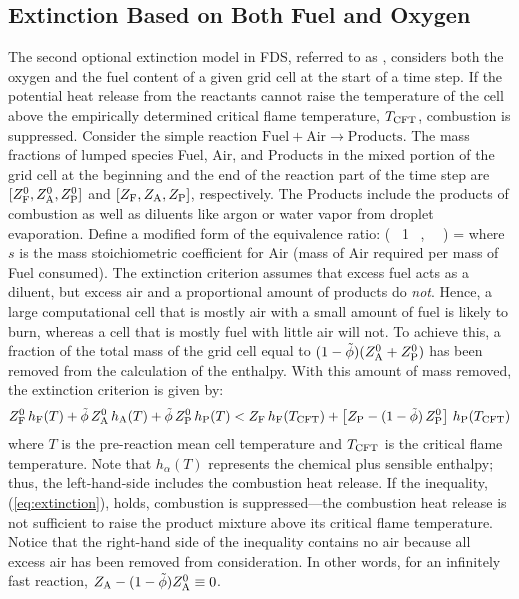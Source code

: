 \subsection{Extinction Based on Both Fuel and Oxygen}

The second optional extinction model in FDS, referred to as , considers both the oxygen and the fuel content of a given grid cell at the start of a time step. If the potential heat release from the reactants cannot raise the temperature of the cell above the empirically determined critical flame temperature, $T_{\rm CFT}$, combustion is suppressed.  Consider the simple reaction $\mbox{Fuel} + \mbox{Air} \rightarrow \mbox{Products}$. The mass fractions of lumped species Fuel, Air, and Products in the mixed portion of the grid cell at the beginning and the end of the reaction part of the time step are $[Z_{\rm F}^0, Z_{\rm A}^0, Z_{\rm P}^0]$ and $[Z_{\rm F}, Z_{\rm A}, Z_{\rm P}]$, respectively. The Products include the products of combustion as well as diluents like argon or water vapor from droplet evaporation. Define a modified form of the equivalence ratio:
\be
   \label{eq:dza}
   \tilde{\phi} \equiv  \min \left( \, 1 \, , \,  \, \right) = 
\ee
where $s$ is the mass stoichiometric coefficient for Air (mass of Air required per mass of Fuel consumed). The extinction criterion assumes that excess fuel acts as a diluent, but excess air and a proportional amount of products do \emph{not}. Hence, a large computational cell that is mostly air with a small amount of fuel is likely to burn, whereas a cell that is mostly fuel with little air will not. To achieve this, a fraction of the total mass of the grid cell equal to $(1-\tilde{\phi}) (Z_{\rm A}^0+Z_{\rm P}^0)$ has been removed from the calculation of the enthalpy. With this amount of mass removed, the extinction criterion is given by:
\begin{equation}
\label{eq:extinction}
Z_{\rm F}^0 \, h_{\rm F}(T) + \tilde{\phi} \, Z_{\rm A}^0 \, h_{\rm A}(T) + \tilde{\phi} \, Z_{\rm P}^0 \, h_{\rm P}(T) <
Z_{\rm F} \, h_{\rm F}(T_{\rm CFT}) + \left[ Z_{\rm P} - (1-\tilde{\phi}) \, Z_{\rm P}^0 \right] \, h_{\rm P}(T_{\rm CFT})
\end{equation}
where $T$ is the pre-reaction mean cell temperature and $T_{\rm CFT}$ is the critical flame temperature. Note that $h_\alpha(T)$ represents the chemical plus sensible enthalpy; thus, the left-hand-side includes the combustion heat release.  If the inequality, (\ref{eq:extinction}), holds, combustion is suppressed---the combustion heat release is not sufficient to raise the product mixture above its critical flame temperature. Notice that the right-hand side of the inequality contains no air because all excess air has been removed from consideration. In other words, for an infinitely fast reaction, $Z_{\rm A}-(1-\tilde{\phi}) Z_{\rm A}^0 \equiv 0$.


